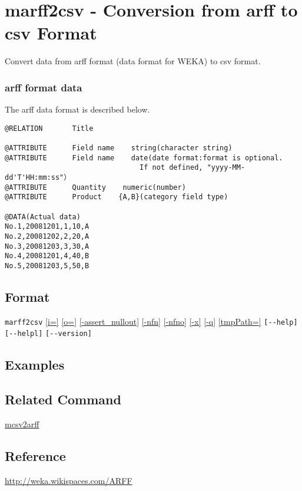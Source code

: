 
%

\section{marff2csv -  Conversion from arff to csv Format \label{sect:marff2csv}}
Convert data from arff format (data format for WEKA) to csv format. 

\subsubsection*{arff format data}
The arff data format is described below.
\begin{Verbatim}[baselinestretch=0.7,frame=single,fontsize=\small]
@RELATION       Title

@ATTRIBUTE      Field name    string(character string)
@ATTRIBUTE      Field name    date(date format:format is optional.
                                If not defined, "yyyy-MM-dd'T'HH:mm:ss"）
@ATTRIBUTE      Quantity    numeric(number)
@ATTRIBUTE      Product    {A,B}(category field type)

@DATA(Actual data)
No.1,20081201,1,10,A
No.2,20081202,2,20,A
No.3,20081203,3,30,A
No.4,20081201,4,40,B
No.5,20081203,5,50,B
\end{Verbatim}

\subsection*{Format}
\verb|marff2csv|
\hyperref[sect:option_i]{[i=]}
\hyperref[sect:option_o]{[o=]}
\hyperref[sect:option_assert_nullout]{[-assert\_nullout]}
\hyperref[sect:option_nfn]{[-nfn]}
\hyperref[sect:option_nfno]{[-nfno]}
\hyperref[sect:option_x]{[-x]}
\hyperref[sect:option_q]{[-q]}
\hyperref[sect:option_option_tmppath]{[tmpPath=]}
\verb|[--help]|
\verb|[--helpl]|
\verb|[--version]|\\

\subsection*{Examples}

\subsection*{Related Command}

\hyperref[sect:mcsv2arff] {mcsv2arff}

\subsection*{Reference}
\href{http://weka.wikispaces.com/ARFF}{http://weka.wikispaces.com/ARFF}

%

